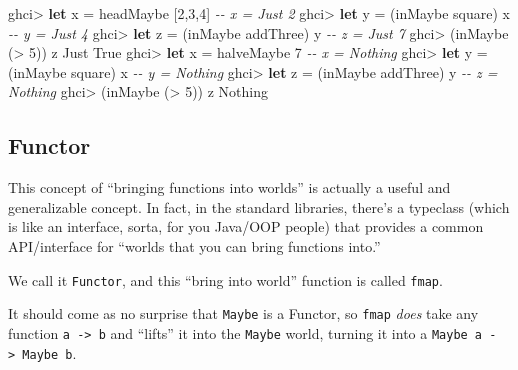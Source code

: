 \documentclass[]{article}
\newenvironment{Shaded}{}{}
\newcommand{\CommentTok}[1]{\textcolor[rgb]{0.38,0.63,0.69}{\textit{#1}}}
\newcommand{\DataTypeTok}[1]{\textcolor[rgb]{0.56,0.13,0.00}{#1}}
\newcommand{\DecValTok}[1]{\textcolor[rgb]{0.25,0.63,0.44}{#1}}
\newcommand{\KeywordTok}[1]{\textcolor[rgb]{0.00,0.44,0.13}{\textbf{#1}}}
\newcommand{\NormalTok}[1]{#1}
\newcommand{\OperatorTok}[1]{\textcolor[rgb]{0.40,0.40,0.40}{#1}}
\newcommand{\OtherTok}[1]{\textcolor[rgb]{0.00,0.44,0.13}{#1}}
\begin{document}
\begin{Shaded}
\begin{Highlighting}[]
\NormalTok{ghci}\OperatorTok{\textgreater{}} \KeywordTok{let}\NormalTok{ x }\OtherTok{=}\NormalTok{ headMaybe [}\DecValTok{2}\NormalTok{,}\DecValTok{3}\NormalTok{,}\DecValTok{4}\NormalTok{]        }\CommentTok{{-}{-} x = Just 2}
\NormalTok{ghci}\OperatorTok{\textgreater{}} \KeywordTok{let}\NormalTok{ y }\OtherTok{=}\NormalTok{ (inMaybe square) x       }\CommentTok{{-}{-} y = Just 4}
\NormalTok{ghci}\OperatorTok{\textgreater{}} \KeywordTok{let}\NormalTok{ z }\OtherTok{=}\NormalTok{ (inMaybe addThree) y     }\CommentTok{{-}{-} z = Just 7}
\NormalTok{ghci}\OperatorTok{\textgreater{}}\NormalTok{ (inMaybe (}\OperatorTok{\textgreater{}} \DecValTok{5}\NormalTok{)) z}
\DataTypeTok{Just} \DataTypeTok{True}
\NormalTok{ghci}\OperatorTok{\textgreater{}} \KeywordTok{let}\NormalTok{ x\textquotesingle{} }\OtherTok{=}\NormalTok{ halveMaybe }\DecValTok{7}            \CommentTok{{-}{-} x\textquotesingle{} = Nothing}
\NormalTok{ghci}\OperatorTok{\textgreater{}} \KeywordTok{let}\NormalTok{ y\textquotesingle{} }\OtherTok{=}\NormalTok{ (inMaybe square) x\textquotesingle{}     }\CommentTok{{-}{-} y\textquotesingle{} = Nothing}
\NormalTok{ghci}\OperatorTok{\textgreater{}} \KeywordTok{let}\NormalTok{ z\textquotesingle{} }\OtherTok{=}\NormalTok{ (inMaybe addThree) y\textquotesingle{}   }\CommentTok{{-}{-} z\textquotesingle{} = Nothing}
\NormalTok{ghci}\OperatorTok{\textgreater{}}\NormalTok{ (inMaybe (}\OperatorTok{\textgreater{}} \DecValTok{5}\NormalTok{)) z\textquotesingle{}}
\DataTypeTok{Nothing}
\end{Highlighting}
\end{Shaded}

\subsection{Functor}\label{functor}

This concept of ``bringing functions into worlds'' is actually a useful and
generalizable concept. In fact, in the standard libraries, there's a typeclass
(which is like an interface, sorta, for you Java/OOP people) that provides a
common API/interface for ``worlds that you can bring functions into.''

We call it \texttt{Functor}, and this ``bring into world'' function is called
\texttt{fmap}.

It should come as no surprise that \texttt{Maybe} is a Functor, so \texttt{fmap}
\emph{does} take any function \texttt{a\ -\textgreater{}\ b} and ``lifts'' it
into the \texttt{Maybe} world, turning it into a
\texttt{Maybe\ a\ -\textgreater{}\ Maybe\ b}.
\end{document}
